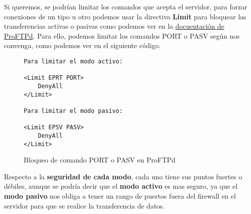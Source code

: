 Si queremos, se podrían limitar los comandos que acepta el servidor, para forzar conexiones de un tipo u otro podemos usar la directiva \textbf{Limit} para bloquear las transferencias activas o pasivas como podemos ver en la \href{http://www.proftpd.org/docs/howto/Limit.html}{docuentación de ProFTPd}. Para ello, podemos limitar los comandos PORT o PASV según nos convenga, como podemos ver en el siguiente código.

\begin{figure}[H]
    \begin{tcolorbox}[sharp corners, colback=yellow!30, colframe=white!20]
        \scriptsize
        \begin{verbatim}
Para limitar el modo activo:

<Limit EPRT PORT>
    DenyAll
</Limit>

Para limitar el modo pasivo:

<Limit EPSV PASV>
    DenyAll
</Limit>
        \end{verbatim}
    \end{tcolorbox}
    \caption{Bloqueo de comando PORT o PASV en ProFTPd}
\end{figure}

Respecto a la \textbf{seguridad de cada modo}, cada uno tiene sus puntos fuertes o débiles, aunque se podría decir que el \textbf{modo activo} es mas seguro, ya que el \textbf{modo pasivo} nos obliga a tener un rango de puertos fuera del firewall en el servidor para que se realice la transferencia de datos.




%
%

